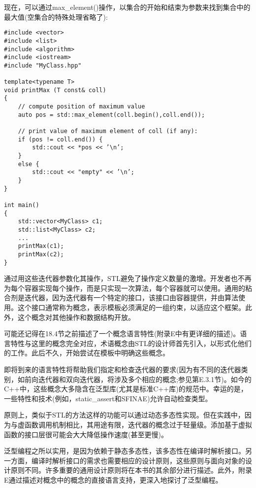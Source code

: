 现在，可以通过max\_element()操作，以集合的开始和结束为参数来找到集合中的最大值(空集合的特殊处理省略了):

\begin{lstlisting}[style=styleCXX]
#include <vector>
#include <list>
#include <algorithm>
#include <iostream>
#include "MyClass.hpp"

template<typename T>
void printMax (T const& coll)
{
	// compute position of maximum value
	auto pos = std::max_element(coll.begin(),coll.end());
	
	// print value of maximum element of coll (if any):
	if (pos != coll.end()) {
		std::cout << *pos << ’\n’;
	}
	else {
		std::cout << "empty" << ’\n’;
	}
}

int main()
{
	std::vector<MyClass> c1;
	std::list<MyClass> c2;
	...
	printMax(c1);
	printMax(c2);
}
\end{lstlisting}

通过用这些迭代器参数化其操作，STL避免了操作定义数量的激增。开发者也不再为每个容器实现每个操作，而是只实现一次算法，每个容器就可以使用。通用的粘合剂是迭代器，因为迭代器有一个特定的接口，该接口由容器提供，并由算法使用。这个接口通常称为概念，表示模板必须满足的一组约束，以适应这个框架。此外，这个概念对其他操作和数据结构开放。

可能还记得在18.4节之前描述了一个概念语言特性(附录E中有更详细的描述)。语言特性与这里的概念完全对应，术语概念由STL的设计师首先引入，以形式化他们的工作。此后不久，开始尝试在模板中明确这些概念。

即将到来的语言特性将帮助我们指定和检查迭代器的要求(因为有不同的迭代器类别，如前向迭代器和双向迭代器，将涉及多个相应的概念;参见第E.3.1节)。如今的C++中，这些概念大多隐含在泛型库(尤其是标准C++库)的规范中。幸运的是，一些特性和技术(例如，static\_assert和SFINAE)允许自动检查类型。

原则上，类似于STL的方法这样的功能可以通过动态多态性实现。但在实践中，因为与虚函数调用机制相比，其用途有限，迭代器的概念过于轻量级。添加基于虚拟函数的接口层很可能会大大降低操作速度(甚至更慢)。

泛型编程之所以实用，是因为依赖于静态多态性，该多态性在编译时解析接口。另一方面，编译时解析接口的需求也需要相应的设计原则，这些原则与面向对象的设计原则不同。许多重要的通用设计原则将在本书的其余部分进行描述。此外，附录E通过描述对概念中的概念的直接语言支持，更深入地探讨了泛型编程。























